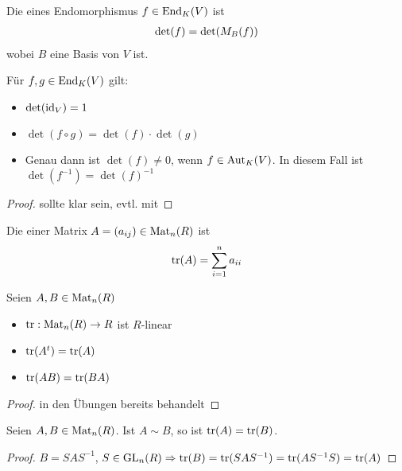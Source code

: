 \begin{definition}
	Die  eines Endomorphismus $f\in \operatorname{End}_K(V)$ ist 
	\begin{align}
		\det(f)=\det(M_B(f))\notag
	\end{align}
	wobei $B$ eine Basis von $V$ ist.
\end{definition}

\begin{proposition}
	Für $f,g\in \operatorname{End}_K(V)$ gilt:
	\begin{itemize}
		\item $\det(\operatorname{id}_V)=1$
		\item $\det(f\circ g)=\det(f)\cdot \det(g)$
		\item Genau dann ist $\det(f)\neq 0$, wenn $f\in \operatorname{Aut}_K(V)$. In diesem Fall ist $\det(f^{-1})=\det(f)^{-1}$
	\end{itemize}
\end{proposition}
\begin{proof}
	sollte klar sein, evtl. mit 
\end{proof}

\begin{definition}
	Die  einer Matrix $A=(a_{ij})\in \operatorname{Mat}_n(R)$ ist 
	\begin{align}
		\operatorname{tr}(A)=\sum_{i=1}^n a_{ii}\notag
	\end{align}
\end{definition}

\begin{lemma}
	Seien $A,B\in \operatorname{Mat}_n(R)$
	\begin{itemize}
		\item $\operatorname{tr}: \operatorname{Mat}_n(R)\to R$ ist $R$-linear
		\item $\operatorname{tr}(A^t)=\operatorname{tr}(A)$
		\item $\operatorname{tr}(AB)=\operatorname{tr}(BA)$
	\end{itemize}
\end{lemma}
\begin{proof}
	in den Übungen bereits behandelt
\end{proof}

\begin{proposition}
	Seien $A,B\in \operatorname{Mat}_n(R)$. Ist $A\sim B$, so ist $\operatorname{tr}(A)=\operatorname{tr}(B)$.
\end{proposition}
\begin{proof}
	$B=SAS^{-1}$, $S\in \operatorname{GL}_n(R)\Rightarrow \operatorname{tr}(B)=\operatorname{tr}(SAS^{-1})=\operatorname{tr}(AS^{-1}S)=\operatorname{tr}(A)$
\end{proof}

